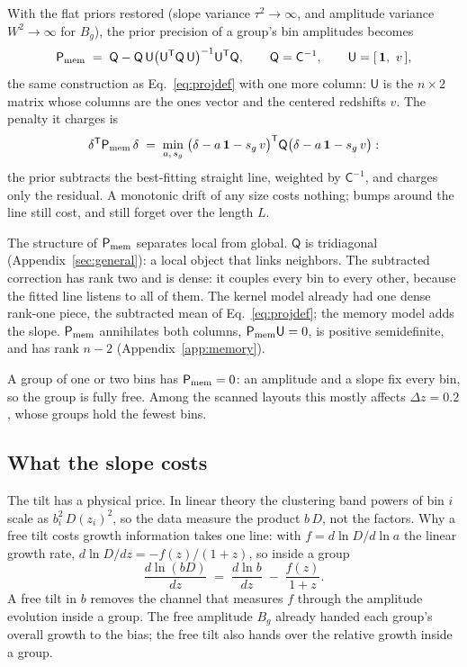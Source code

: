 \documentclass[11pt]{article}
\newcommand{\ones}{\mathbf{1}} %
\newcommand{\Cov}{\mathsf{C}}
\newcommand{\Prec}{\mathsf{P}}
\newcommand{\T}{^{\mathsf{T}}}
\begin{document}
With the flat priors restored (slope variance $\tau^2 \to \infty$,
and amplitude variance $W^2 \to \infty$ for $B_g$), the prior
precision of a group's bin amplitudes becomes
\begin{equation}
  \Prec_{\rm mem}
  \;=\;
  \mathsf{Q} - \mathsf{Q}\,\mathsf{U}
  \bigl(\mathsf{U}\T \mathsf{Q}\, \mathsf{U}\bigr)^{-1}
  \mathsf{U}\T \mathsf{Q},
  \qquad
  \mathsf{Q} = \Cov^{-1},
  \qquad
  \mathsf{U} = [\,\ones,\ v\,],
  \label{eq:memproj}
\end{equation}
the same construction as Eq.~\eqref{eq:projdef} with one more
column: $\mathsf{U}$ is the $n \times 2$ matrix whose columns are
the ones vector and the centered redshifts $v$.  The penalty it
charges is
\begin{equation}
  \delta\T \Prec_{\rm mem}\, \delta
  \;=\;
  \min_{a,\, s_g}\;
  \bigl(\delta - a\,\ones - s_g\, v\bigr)\T
  \mathsf{Q}
  \bigl(\delta - a\,\ones - s_g\, v\bigr) :
  \label{eq:memmin}
\end{equation}
the prior subtracts the best-fitting straight line, weighted by
$\Cov^{-1}$, and charges only the residual.  A monotonic drift of
any size costs nothing; bumps around the line still cost, and still
forget over the length $L$.

The structure of $\Prec_{\rm mem}$ separates local from global.
$\mathsf{Q}$ is tridiagonal (Appendix~\ref{sec:general}): a local
object that links neighbors.  The subtracted correction has rank two
and is dense: it couples every bin to every other, because the
fitted line listens to all of them.  The kernel model already had
one dense rank-one piece, the subtracted mean of
Eq.~\eqref{eq:projdef}; the memory model adds the slope.
$\Prec_{\rm mem}$ annihilates both columns,
$\Prec_{\rm mem}\mathsf{U} = 0$, is positive semidefinite, and has
rank $n - 2$ (Appendix~\ref{app:memory}).

A group of one or two bins has $\Prec_{\rm mem} = 0$: an amplitude
and a slope fix every bin, so the group is fully free.  Among the
scanned layouts this mostly affects $\Delta z = 0.2$, whose groups
hold the fewest bins.

\subsection{What the slope costs}
\label{sec:memcost}

The tilt has a physical price.  In linear theory the clustering band
powers of bin $i$ scale as $b_i^2\, D(z_i)^2$, so the data measure
the product $b\,D$, not the factors.  Why a free tilt costs growth
information takes one line: with $f = d\ln D/d\ln a$ the linear
growth rate, $d\ln D/dz = -f(z)/(1+z)$, so inside a group
\begin{equation}
  \frac{d \ln (b D)}{dz}
  \;=\;
  \frac{d \ln b}{dz} \;-\; \frac{f(z)}{1+z} .
  \label{eq:tiltcost}
\end{equation}
A free tilt in $b$ removes the channel that measures $f$ through the
amplitude evolution inside a group.  The free amplitude $B_g$
already handed each group's overall growth to the bias; the free
tilt also hands over the relative growth inside a group.
\end{document}
